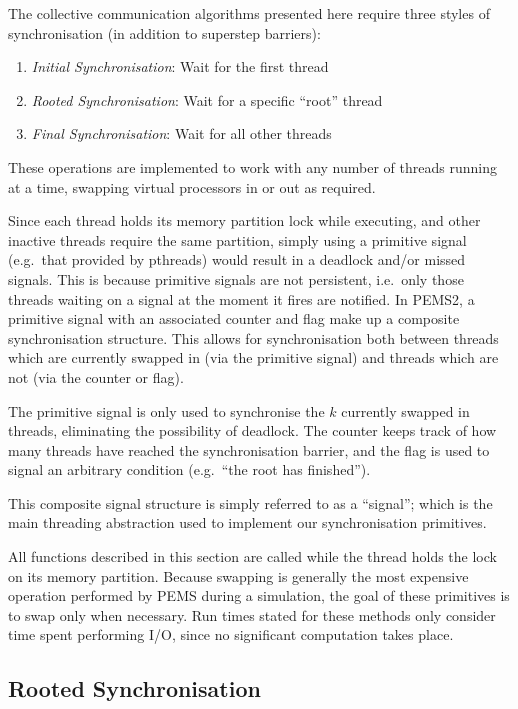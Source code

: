\documentclass[12pt]{carletoncsthesis}
\begin{document}
The collective communication algorithms presented here require three
styles of synchronisation (in addition to superstep barriers):

\begin{enumerate}
\item {\em Initial Synchronisation}: Wait for the first thread
\item {\em Rooted Synchronisation}: Wait for a specific ``root'' thread
\item {\em Final Synchronisation}: Wait for all other threads
\end{enumerate}

These operations are implemented to work with any number of threads running
at a time, swapping virtual processors in or out as required.

Since each thread holds its memory partition lock while executing, and other
inactive threads require the same partition, simply using a primitive signal
(e.g.\ that provided by pthreads) would result in a deadlock and/or missed
signals.  This is because primitive signals are not persistent, i.e.\ only
those threads waiting on a signal at the moment it fires are notified.
In PEMS2, a primitive signal with an associated counter and flag make up a
composite synchronisation structure.  This allows for synchronisation both
between threads which are currently swapped in (via the primitive signal)
and threads which are not (via the counter or flag).

The primitive signal is only used to synchronise the $k$ currently swapped in
threads, eliminating the possibility of deadlock.  The counter keeps track
of how many threads have reached the synchronisation barrier, and the flag
is used to signal an arbitrary condition (e.g.\ ``the root has finished'').

This composite signal structure is simply referred to as a ``signal''; which
is the main threading abstraction used to implement our synchronisation
primitives.

All functions described in this section are called while the thread holds
the lock on its memory partition.  Because swapping is generally the most
expensive operation performed by PEMS during a simulation, the goal of these
primitives is to swap only when necessary.  Run times stated for these methods
only consider time spent performing I/O, since no significant computation
takes place.

\clearpage
\subsection{Rooted Synchronisation}
\end{document}
